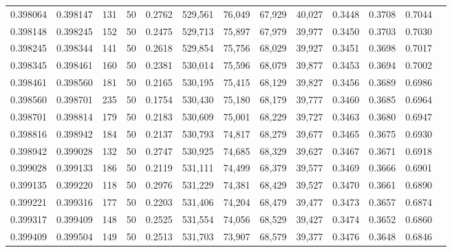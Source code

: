 \begin{tabular}{rrrrrrrrrrrrr}
0.398064 & 0.398147 &   131 &  50 &                                     0.2762 & 529,561 &  76,049 &  67,929 &  40,027 & 0.3448 & 0.3708 & 0.7044 \\
0.398148 & 0.398245 &   152 &  50 &                                     0.2475 & 529,713 &  75,897 &  67,979 &  39,977 & 0.3450 & 0.3703 & 0.7030 \\
0.398245 & 0.398344 &   141 &  50 &                                     0.2618 & 529,854 &  75,756 &  68,029 &  39,927 & 0.3451 & 0.3698 & 0.7017 \\
0.398345 & 0.398461 &   160 &  50 &                                     0.2381 & 530,014 &  75,596 &  68,079 &  39,877 & 0.3453 & 0.3694 & 0.7002 \\
0.398461 & 0.398560 &   181 &  50 &                                     0.2165 & 530,195 &  75,415 &  68,129 &  39,827 & 0.3456 & 0.3689 & 0.6986 \\
0.398560 & 0.398701 &   235 &  50 &                                     0.1754 & 530,430 &  75,180 &  68,179 &  39,777 & 0.3460 & 0.3685 & 0.6964 \\
0.398701 & 0.398814 &   179 &  50 &                                     0.2183 & 530,609 &  75,001 &  68,229 &  39,727 & 0.3463 & 0.3680 & 0.6947 \\
0.398816 & 0.398942 &   184 &  50 &                                     0.2137 & 530,793 &  74,817 &  68,279 &  39,677 & 0.3465 & 0.3675 & 0.6930 \\
0.398942 & 0.399028 &   132 &  50 &                                     0.2747 & 530,925 &  74,685 &  68,329 &  39,627 & 0.3467 & 0.3671 & 0.6918 \\
0.399028 & 0.399133 &   186 &  50 &                                     0.2119 & 531,111 &  74,499 &  68,379 &  39,577 & 0.3469 & 0.3666 & 0.6901 \\
0.399135 & 0.399220 &   118 &  50 &                                     0.2976 & 531,229 &  74,381 &  68,429 &  39,527 & 0.3470 & 0.3661 & 0.6890 \\
0.399221 & 0.399316 &   177 &  50 &                                     0.2203 & 531,406 &  74,204 &  68,479 &  39,477 & 0.3473 & 0.3657 & 0.6874 \\
0.399317 & 0.399409 &   148 &  50 &                                     0.2525 & 531,554 &  74,056 &  68,529 &  39,427 & 0.3474 & 0.3652 & 0.6860 \\
0.399409 & 0.399504 &   149 &  50 &                                     0.2513 & 531,703 &  73,907 &  68,579 &  39,377 & 0.3476 & 0.3648 & 0.6846 \\

\end{tabular}
